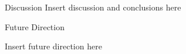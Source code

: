 \documentclass[final]{beamer}
\newlength{\sepwidth}
\newlength{\colwidth}
\newcommand{\separatorcolumn}{\begin{column}{\sepwidth}\end{column}}
\begin{document}
\begin{frame}[t]
\begin{columns}[t]
\begin{column}{\colwidth}
\begin{block}{Discussion}
    \medskip
    Insert discussion and conclusions here
    \vspace{400px}

  \end{block}

  \begin{block}{Future Direction}

    \medskip
    Insert future direction here
    \vspace{300px}

  \end{block}

\end{column}

\separatorcolumn
\end{columns}
\end{frame}
\end{document}
